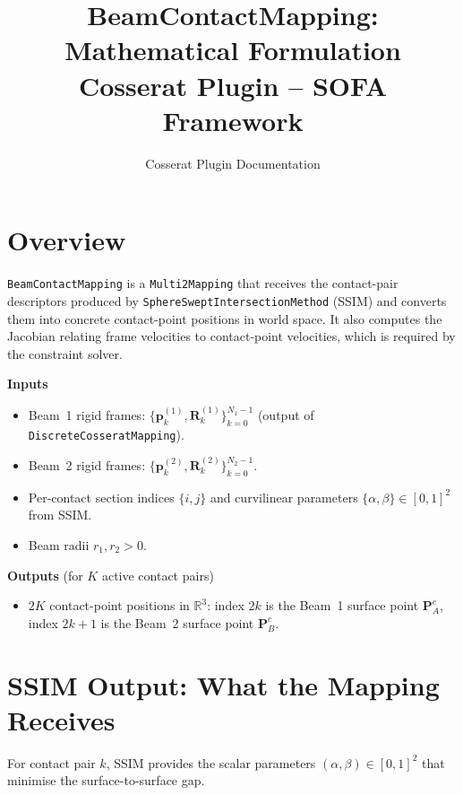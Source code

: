 \documentclass[11pt, a4paper]{article}
\title{\textbf{BeamContactMapping: Mathematical Formulation}\\
       \large Cosserat Plugin -- SOFA Framework}
\author{Cosserat Plugin Documentation}
\date{}
\newcommand{\vv}[1]{\bm{#1}}
\begin{document}
\maketitle
\tableofcontents

\section{Overview}

\texttt{BeamContactMapping} is a \texttt{Multi2Mapping} that receives the
contact-pair descriptors produced by \texttt{SphereSweptIntersectionMethod}
(SSIM) and converts them into concrete contact-point positions in world space.
It also computes the Jacobian relating frame velocities to contact-point
velocities, which is required by the constraint solver.

\textbf{Inputs}
\begin{itemize}
  \item Beam~1 rigid frames: $\{\vv{p}^{(1)}_k, \vv{R}^{(1)}_k\}_{k=0}^{N_1-1}$
        (output of \texttt{DiscreteCosseratMapping}).
  \item Beam~2 rigid frames: $\{\vv{p}^{(2)}_k, \vv{R}^{(2)}_k\}_{k=0}^{N_2-1}$.
  \item Per-contact section indices $\{i, j\}$ and curvilinear parameters
        $\{\alpha, \beta\} \in [0,1]^2$ from SSIM.
  \item Beam radii $r_1, r_2 > 0$.
\end{itemize}

\textbf{Outputs} (for $K$ active contact pairs)
\begin{itemize}
  \item $2K$ contact-point positions in $\mathbb{R}^3$:
        index $2k$ is the Beam~1 surface point $\vv{P}^c_A$,
        index $2k+1$ is the Beam~2 surface point $\vv{P}^c_B$.
\end{itemize}

\section{SSIM Output: What the Mapping Receives}

For contact pair $k$, SSIM provides the scalar parameters
$(\alpha, \beta) \in [0,1]^2$ that minimise the surface-to-surface gap.
\end{document}
